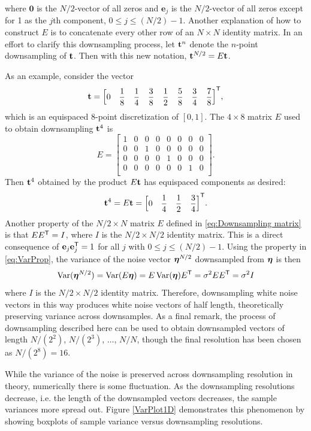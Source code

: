 where $\mathbf{0}$ is the $N/2$-vector of all zeros and $\mathbf{e}_j$ is the $N/2$-vector of all zeros except for 1 as the $j\text{th}$ component, $0 \leq j \leq (N/2)-1$. Another explanation of how to construct $E$ is to concatenate every other row of an $N \times N$ identity matrix. In an effort to clarify this downsampling process, let $\mathbf{t}^{n}$ denote the $n$-point downsampling of $\mathbf{t}$. Then with this new notation, $\mathbf{t}^{N/2} = E\mathbf{t}$. \par
As an example, consider the vector
\[\mathbf{t} = {\begin{bmatrix}
0 & \dfrac{1}{8} & \dfrac{1}{4} & \dfrac{3}{8} & \dfrac{1}{2} & \dfrac{5}{8} & \dfrac{3}{4} & \dfrac{7}{8}
\end{bmatrix}}^\mathsf{T},\]
which is an equispaced 8-point discretization of $[0,1]$. The $4 \times 8$ matrix $E$ used to obtain downsampling $\mathbf{t}^{4}$ is
\[E = \begin{bmatrix}
1 & 0 & 0 & 0 & 0 & 0 & 0 & 0 \\
0 & 0 & 1 & 0 & 0 & 0 & 0 & 0 \\
0 & 0 & 0 & 0 & 1 & 0 & 0 & 0 \\
0 & 0 & 0 & 0 & 0 & 0 & 1 & 0 \\
\end{bmatrix}.\]
Then $\mathbf{t}^4$ obtained by the product $E\mathbf{t}$ has equispaced components as desired:
\[\mathbf{t}^4 = E\mathbf{t} = {\begin{bmatrix}
0 & \dfrac{1}{4} & \dfrac{1}{2} & \dfrac{3}{4}
\end{bmatrix}}^\mathsf{T}.\]
\indent Another property of the $N/2 \times N$ matrix $E$ defined in \eqref{eq:Downsampling matrix} is that $E{E}^\mathsf{T} = I$, where $I$ is the $N/2 \times N/2$ identity matrix.  This is a direct consequence of $\mathbf{e}_j{\mathbf{e}}^\mathsf{T}_j = 1$ for all $j$ with $0 \leq j \leq (N/2)-1$. Using the property in \eqref{eq:VarProp}, the variance of the  noise vector $\bm{\eta}^{N/2}$ downsampled from $\bm{\eta}$ is then
\[\operatorname{Var}(\bm{\eta}^{N/2}) = \operatorname{Var}(E\bm{\eta}) = E\operatorname{Var}(\bm{\eta}){E}^\mathsf{T} = \sigma^2E{E}^\mathsf{T} = \sigma^2I\]
where $I$ is the $N/2 \times N/2$ identity matrix. Therefore, downsampling white noise vectors in this way produces white noise vectors of half length, theoretically preserving variance across downsamples. As a final remark, the process of downsampling described here can be used to obtain downsampled vectors of length $N/(2^2)$, $N/(2^3)$, $\ldots$, $N/N$, though the final resolution has been chosen as $N/(2^8) = 16$. \par
While the variance of the noise is preserved across downsampling resolution in theory, numerically there is some fluctuation. As the downsampling resolutions decrease, i.e. the length of the downsampled vectors decreases, the sample variances more spread out. Figure \ref{VarPlot1D} demonstrates this phenomenon by showing boxplots of sample variance versus downsampling resolutions. %


